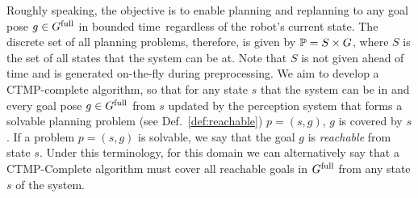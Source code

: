 \documentclass[a4paper]{report}
\begin{document}
Roughly speaking, the objective is to enable planning and replanning to any goal pose $ g \in G^{\textrm{full}}$ in bounded time~\Tbound regardless of the robot's current state.
%
%
%
%
The discrete set of all planning problems, therefore, is given by $\mathbb{P} = S \times G$, where $S$ is the set of all states that the system can be at. Note that $S$ is not given ahead of time and is generated on-the-fly during preprocessing.
%
We aim to develop a CTMP-complete algorithm, so that 
for any state $s$ that the system can be in 
and every goal pose $g \in G^{\textrm{full}}$ from $s$ updated by the perception system that forms a solvable planning problem (see Def.~\ref{def:reachable}) $p = (s,g)$,
$g$ is covered by $s$. If a problem $p = (s,g)$ is solvable, we say that the goal $g$ is \emph{reachable} from state $s$. Under this terminology, for this domain we can alternatively say that a CTMP-Complete algorithm must cover all reachable goals in $G^{\textrm{full}}$ from any state $s$ of the system.
\end{document}
